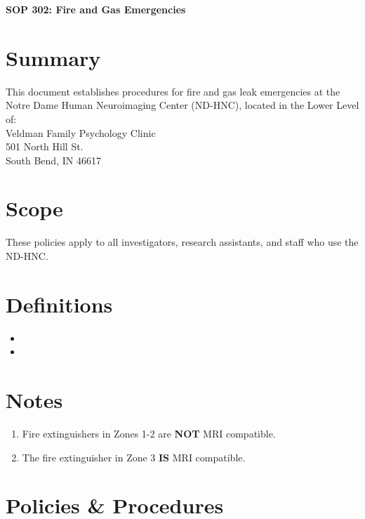 \documentclass[11pt]{article}
\begin{document}
\renewcommand{\labelenumii}{\arabic{enumi}.\arabic{enumii}}
\renewcommand{\labelenumiii}{\arabic{enumi}.\arabic{enumii}.\arabic{enumiii}}
\renewcommand{\labelenumiv}{\arabic{enumi}.\arabic{enumii}.\arabic{enumiii}.\arabic{enumiv}}

\begin{center}
	\textbf{\Large SOP 302: Fire and Gas Emergencies}\\
	\hrulefill
\end{center}


\section{Summary}
This document establishes  procedures for fire and gas leak emergencies at the Notre Dame Human Neuroimaging Center (ND-HNC), located in the Lower Level of:\\

Veldman Family Psychology Clinic\\
501 North Hill St.\\
South Bend, IN 46617

\section{Scope}
These policies apply to all investigators, research assistants, and staff who use the ND-HNC.

\section{Definitions}

\begin{itemize}
	\item \NDHNC
	\item \VFPC
\end{itemize}


\section{Notes}

\begin{enumerate}
    \item Fire extinguishers in Zones 1-2 are \textbf{NOT} MRI compatible.
    \item The fire extinguisher in Zone 3 \textbf{IS} MRI compatible.
\end{enumerate}


\section{Policies \& Procedures}
\end{document}
